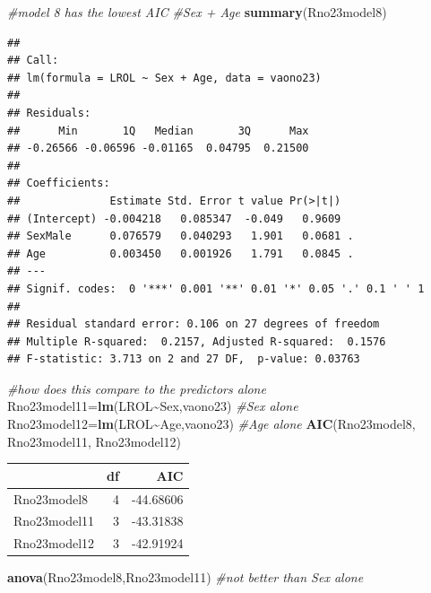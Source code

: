 \documentclass[
]{article}
\newenvironment{Shaded}{\begin{snugshade}}{\end{snugshade}}
\newcommand{\CommentTok}[1]{\textcolor[rgb]{0.56,0.35,0.01}{\textit{#1}}}
\newcommand{\FunctionTok}[1]{\textcolor[rgb]{0.13,0.29,0.53}{\textbf{#1}}}
\newcommand{\NormalTok}[1]{#1}
\newcommand{\OtherTok}[1]{\textcolor[rgb]{0.56,0.35,0.01}{#1}}
\newcommand{\SpecialCharTok}[1]{\textcolor[rgb]{0.81,0.36,0.00}{\textbf{#1}}}
\begin{document}
\begin{Shaded}
\begin{Highlighting}[]
\CommentTok{\#model 8 has the lowest AIC}
\CommentTok{\#Sex + Age}
\FunctionTok{summary}\NormalTok{(Rno23model8)}
\end{Highlighting}
\end{Shaded}

\begin{verbatim}
## 
## Call:
## lm(formula = LROL ~ Sex + Age, data = vaono23)
## 
## Residuals:
##      Min       1Q   Median       3Q      Max 
## -0.26566 -0.06596 -0.01165  0.04795  0.21500 
## 
## Coefficients:
##              Estimate Std. Error t value Pr(>|t|)  
## (Intercept) -0.004218   0.085347  -0.049   0.9609  
## SexMale      0.076579   0.040293   1.901   0.0681 .
## Age          0.003450   0.001926   1.791   0.0845 .
## ---
## Signif. codes:  0 '***' 0.001 '**' 0.01 '*' 0.05 '.' 0.1 ' ' 1
## 
## Residual standard error: 0.106 on 27 degrees of freedom
## Multiple R-squared:  0.2157, Adjusted R-squared:  0.1576 
## F-statistic: 3.713 on 2 and 27 DF,  p-value: 0.03763
\end{verbatim}

\begin{Shaded}
\begin{Highlighting}[]
\CommentTok{\#how does this compare to the predictors alone}
\NormalTok{Rno23model11}\OtherTok{=}\FunctionTok{lm}\NormalTok{(LROL}\SpecialCharTok{\textasciitilde{}}\NormalTok{Sex,vaono23) }\CommentTok{\#Sex alone}
\NormalTok{Rno23model12}\OtherTok{=}\FunctionTok{lm}\NormalTok{(LROL}\SpecialCharTok{\textasciitilde{}}\NormalTok{Age,vaono23) }\CommentTok{\#Age alone}
\FunctionTok{AIC}\NormalTok{(Rno23model8, Rno23model11, Rno23model12)}
\end{Highlighting}
\end{Shaded}

\begin{longtable}[]{@{}lrr@{}}
\toprule\noalign{}
& df & AIC \\
\midrule\noalign{}
\endhead
\bottomrule\noalign{}
\endlastfoot
Rno23model8 & 4 & -44.68606 \\
Rno23model11 & 3 & -43.31838 \\
Rno23model12 & 3 & -42.91924 \\
\end{longtable}

\begin{Shaded}
\begin{Highlighting}[]
\FunctionTok{anova}\NormalTok{(Rno23model8,Rno23model11) }\CommentTok{\#not better than Sex alone}
\end{Highlighting}
\end{Shaded}
\end{document}
